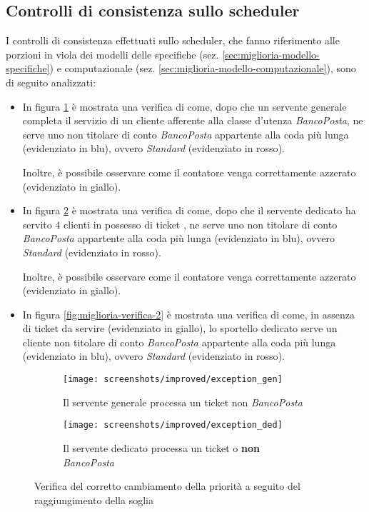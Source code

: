 \subsection{Controlli di consistenza sullo scheduler}
I controlli di consistenza effettuati sullo scheduler, che fanno riferimento alle porzioni in {\color{purple} viola} dei modelli delle specifiche (sez. \ref{sec:miglioria-modello-specifiche}) e computazionale (sez. \ref{sec:miglioria-modello-computazionale}), sono di seguito analizzati:
\begin{itemize}
\item In figura \ref{fig:miglioria-verifica-1a} è mostrata una verifica di come, dopo che un servente generale completa il servizio di un cliente afferente alla classe d'utenza \uo{} \textsl{BancoPosta}, ne serve uno non titolare di conto \textsl{BancoPosta} appartente alla coda più lunga (evidenziato in {\color{verify_blue}blu}), ovvero \uo{} \textsl{Standard} (evidenziato in {\color{verify_red}rosso}). 

Inoltre, è possibile osservare come il contatore venga correttamente azzerato (evidenziato in {\color{verify_yellow}giallo}).
\item In figura \ref{fig:miglioria-verifica-1b} è mostrata una verifica di come, dopo che il servente dedicato ha servito $4$ clienti in possesso di ticket \sr{}, ne serve uno non titolare di conto \textsl{BancoPosta} appartente alla coda più lunga (evidenziato in {\color{verify_blue}blu}), ovvero \pp{} \textsl{Standard} (evidenziato in {\color{verify_red}rosso}). 

Inoltre, è possibile osservare come il contatore venga correttamente azzerato (evidenziato in {\color{verify_yellow}giallo}).
\item In figura \ref{fig:miglioria-verifica-2} è mostrata una verifica di come, in assenza di ticket \sr{} da servire (evidenziato in {\color{verify_yellow}giallo}), lo sportello dedicato serve un cliente non titolare di conto \textsl{BancoPosta} appartente alla coda più lunga (evidenziato in {\color{verify_blue}blu}), ovvero \uo{} \textsl{Standard} (evidenziato in {\color{verify_red}rosso}).
\end{itemize}

\begin{figure}[ht]
\centering
\captionsetup[subfigure]{justification=centering}
\begin{subfigure}[b]{0.475\textwidth}
\centering 
\texttt{[image: screenshots/improved/exception\_gen]}
\caption{Il servente generale processa un ticket non \textsl{BancoPosta}}   
\label{fig:miglioria-verifica-1a}
\end{subfigure}
\hfill
\begin{subfigure}[b]{0.475\textwidth}   
\centering 
\texttt{[image: screenshots/improved/exception\_ded]}
\caption{Il servente dedicato processa un ticket \uo{} o \pp{} \textbf{non} \textsl{BancoPosta}}    
\label{fig:miglioria-verifica-1b}
\end{subfigure}
\caption{Verifica del corretto cambiamento della priorità a seguito del raggiungimento della soglia}
\label{fig:miglioria-verifica-1}
\end{figure}

